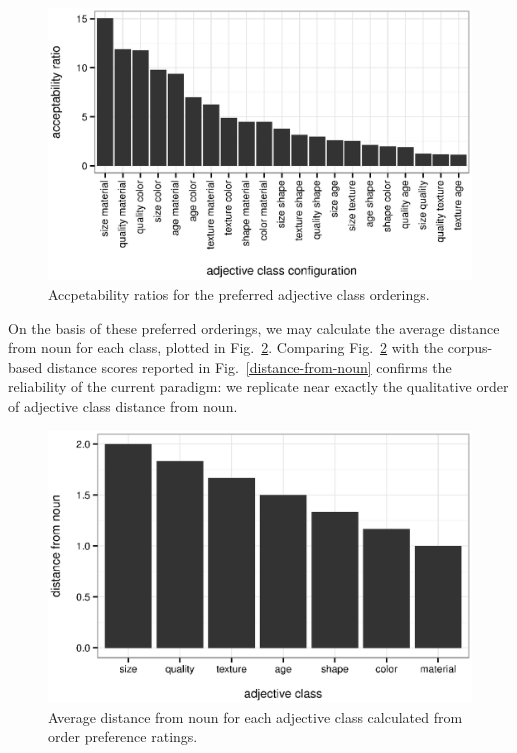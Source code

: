 \documentclass{pnastwo}
\begin{document}
\begin{article}
\begin{figure}[h]
	\centering
	\includegraphics[width=.95\linewidth]{plots/order_ratio.eps}
	\caption{Accpetability ratios for the preferred adjective class orderings.}\label{order-ratio}
\end{figure}

On the basis of these preferred orderings, we may calculate the average distance from noun for each class, plotted in Fig.\ \ref{class-distance}. Comparing Fig.\ \ref{class-distance} with the corpus-based distance scores reported in Fig.\ \ref{distance-from-noun} confirms the reliability of the current paradigm: we replicate near exactly the qualitative order of adjective class distance from noun. 

\begin{figure}[h]
	\centering
	\includegraphics[width=.95\linewidth]{plots/class_distance.eps}
	\caption{Average distance from noun for each adjective class calculated from order preference ratings.}\label{class-distance}
\end{figure}


\end{article}
\end{document}
